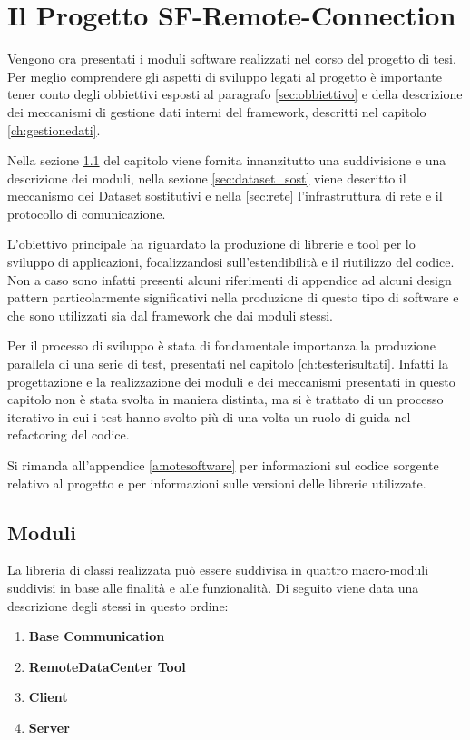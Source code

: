 
\chapter{Il Progetto SF-Remote-Connection}
\label{ch:sfremoteconnection}

Vengono ora presentati i moduli software realizzati nel corso del progetto di tesi.
Per meglio comprendere gli aspetti di sviluppo legati al progetto \`e importante tener conto degli obbiettivi esposti al paragrafo \ref{sec:obbiettivo} e della descrizione dei meccanismi di gestione dati interni del framework, descritti nel capitolo \ref{ch:gestionedati}.

Nella sezione \ref{sec:moduli} del capitolo viene fornita innanzitutto una suddivisione e una descrizione dei moduli, nella sezione \ref{sec:dataset_sost} viene descritto il meccanismo dei Dataset sostitutivi e nella \ref{sec:rete} l'infrastruttura di rete e il protocollo di comunicazione.

L'obiettivo principale ha riguardato la produzione di librerie e tool per lo sviluppo di applicazioni, focalizzandosi sull'estendibilit\`a e il riutilizzo del codice. Non a caso sono infatti presenti alcuni riferimenti di appendice ad alcuni design pattern particolarmente significativi nella produzione di questo tipo di software e che sono utilizzati sia dal framework che dai moduli stessi.

Per il processo di sviluppo \`e stata di fondamentale importanza la produzione parallela di una serie di test, presentati nel capitolo \ref{ch:testerisultati}. Infatti la progettazione e la realizzazione dei moduli e dei meccanismi presentati in questo capitolo non \`e stata svolta in maniera distinta, ma si \`e trattato di un processo iterativo in cui i test hanno svolto pi\`u di una volta un ruolo di guida nel refactoring del codice.

Si rimanda all'appendice \ref{a:notesoftware} per informazioni sul codice sorgente relativo al progetto e per informazioni sulle versioni delle librerie utilizzate.

\section{Moduli} 
\label{sec:moduli}
La libreria di classi realizzata pu\`o essere suddivisa in quattro macro-moduli suddivisi in base alle finalit\`a e alle funzionalit\`a.
Di seguito viene data una descrizione degli stessi in questo ordine:
\begin{enumerate}
	\item \textbf{Base Communication}
	\item \textbf{RemoteDataCenter Tool}
	\item \textbf{Client}
	\item \textbf{Server}
\end{enumerate}

